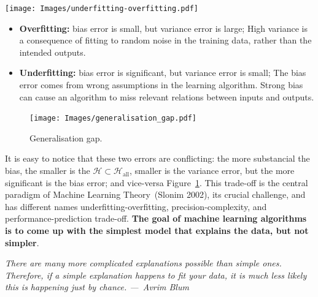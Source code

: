 \documentclass[
  letterpaper,
  12pt,
  british]{tufte-book}
\renewenvironment{quote}{
  \list{}{\leftmargin=3.5cm\topsep=0pt}
  \item\relax\small\itshape
}
{\endlist}
\theoremstyle{plain}
\theoremstyle{definition}
\theoremstyle{plain}
\theoremstyle{remark}
\begin{document}
\texttt{[image: Images/underfitting-overfitting.pdf]}

\begin{itemize}
\item
  \textbf{Overfitting:} bias error is small, but variance error is
  large; High variance is a consequence of fitting to random noise in
  the training data, rather than the intended outputs.
\item
  \textbf{Underfitting:} bias error is significant, but variance error
  is small; The bias error comes from wrong assumptions in the learning
  algorithm. Strong bias can cause an algorithm to miss relevant
  relations between inputs and outputs.
\end{itemize}

\begin{figure}

{\centering \texttt{[image: Images/generalisation\_gap.pdf]}

}

\caption{\label{fig-generalisation_gap}Generalisation gap.}

\end{figure}

It is easy to notice that these two errors are conflicting: the more
substancial the bias, the smaller is the
\(\mathcal{H}\subset \mathcal{H}_{\text{all}}\), smaller is the variance
error, but the more significant is the bias error; and vice-versa
Figure~\ref{fig-generalisation_gap}. This trade-off is the central
paradigm of Machine Learning Theory~(Slonim
2002),
its crucial challenge, and has different names underfitting-overfitting,
precision-complexity, and performance-prediction trade-off. \textbf{The
goal of machine learning algorithms is to come up with the simplest
model that explains the data, but not simpler}.

\begin{quote}
\emph{There are many more complicated explanations possible than simple
ones. Therefore, if a simple explanation happens to fit your data, it is
much less likely this is happening just by chance. ---~Avrim Blum~\\
}
\end{quote}
\end{document}
